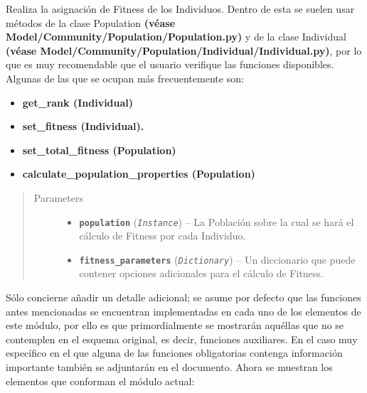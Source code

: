 \documentclass[class=report, crop=false]{standalone}
\begin{document}
\begin{fulllineitems}

Realiza la asignación de Fitness de los Individuos.\break
Dentro de esta se suelen usar métodos de la clase Population 
\textbf{(véase Model/}\break\textbf{Community/Population/Population.py)} y de 
la clase Individual \textbf{(véase Model/}\break\textbf{Community/Population/Individual/Individual.py)}, 
por lo que es muy recomendable que el usuario verifique las 
funciones disponibles. Algunas de las que se ocupan más 
frecuentemente son:

\begin{itemize}
\item \textbf{get\_rank (Individual)}
\item \textbf{set\_fitness (Individual).}
\item \textbf{set\_total\_fitness (Population)}
\item \textbf{calculate\_population\_properties (Population)}
\end{itemize}

\begin{quote}\begin{description}
\item[{Parameters}] \leavevmode\begin{itemize}
\item \textbf{\texttt{population}} (\emph{\texttt{Instance}}) -- La Población sobre la cual se hará el cálculo de Fitness por cada Individuo.
\item \textbf{\texttt{fitness\_parameters}} (\emph{\texttt{Dictionary}}) -- Un diccionario que puede contener opciones adicionales para el cálculo
de Fitness.
\end{itemize}
\end{description}\end{quote}

\end{fulllineitems}

Sólo concierne añadir un detalle adicional; se asume por defecto que las
funciones antes mencionadas se encuentran implementadas en cada uno de los
elementos de este módulo, por ello es que primordialmente se mostrarán 
aquéllas que no se contemplen en el esquema original, es decir, funciones 
auxiliares.\break
En el caso muy específico en el que alguna de las funciones obligatorias 
contenga información importante también se adjuntarán en el documento.\medskip\break  
Ahora se muestran los elementos que conforman el 
módulo actual:
\end{document}
